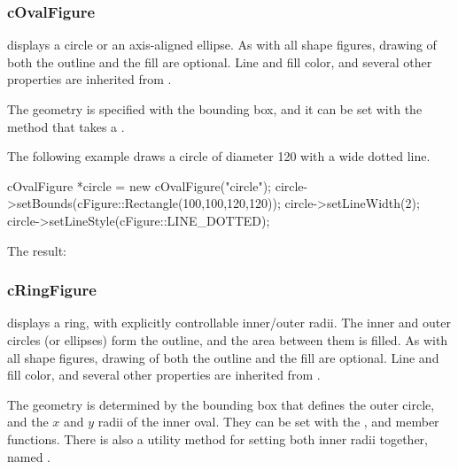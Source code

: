 \begin{center}

\end{center}


\subsubsection{cOvalFigure}
\label{sec:graphics:ovalfigure}

 displays a circle or an axis-aligned ellipse. As with
all shape figures, drawing of both the outline and the fill are optional.
Line and fill color, and several other properties are inherited from
.

The geometry is specified with the bounding box, and it can be set with the
 method that takes a .

The following example draws a circle of diameter 120 with a wide dotted line.

\begin{cpp}
cOvalFigure *circle = new cOvalFigure("circle");
circle->setBounds(cFigure::Rectangle(100,100,120,120));
circle->setLineWidth(2);
circle->setLineStyle(cFigure::LINE_DOTTED);
\end{cpp}


The result:

\begin{center}

\end{center}


\subsubsection{cRingFigure}
\label{sec:graphics:ringfigure}

 displays a ring, with explicitly controllable
inner/outer radii. The inner and outer circles (or ellipses) form the
outline, and the area between them is filled. As with all shape figures,
drawing of both the outline and the fill are optional. Line and fill color,
and several other properties are inherited from
.

The geometry is determined by the bounding box that defines the outer
circle, and the $x$ and $y$ radii of the inner oval. They can be set with
the ,  and 
member functions. There is also a utility method for setting both
inner radii together, named .

